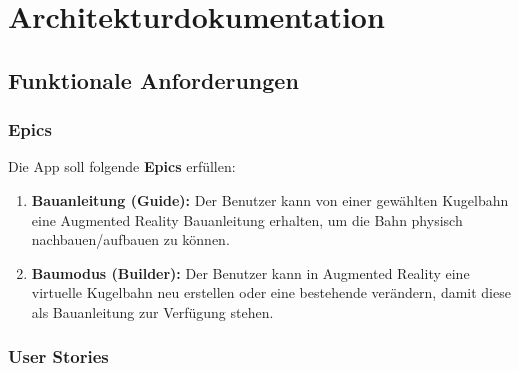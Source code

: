 \section{Architekturdokumentation}
\subsection{Funktionale Anforderungen}
\subsubsection{Epics}
Die App soll folgende \textbf{Epics} erfüllen:
\begin{enumerate}
	\item \textbf{Bauanleitung (Guide):} Der Benutzer kann von einer gewählten Kugelbahn eine Augmented Reality Bauanleitung erhalten, um die Bahn physisch nachbauen/aufbauen zu können.
	\item \textbf{Baumodus (Builder):} Der Benutzer kann in Augmented Reality eine virtuelle Kugelbahn neu erstellen oder eine bestehende verändern, damit diese als Bauanleitung zur Verfügung stehen.
\end{enumerate}

\subsubsection{User Stories}

